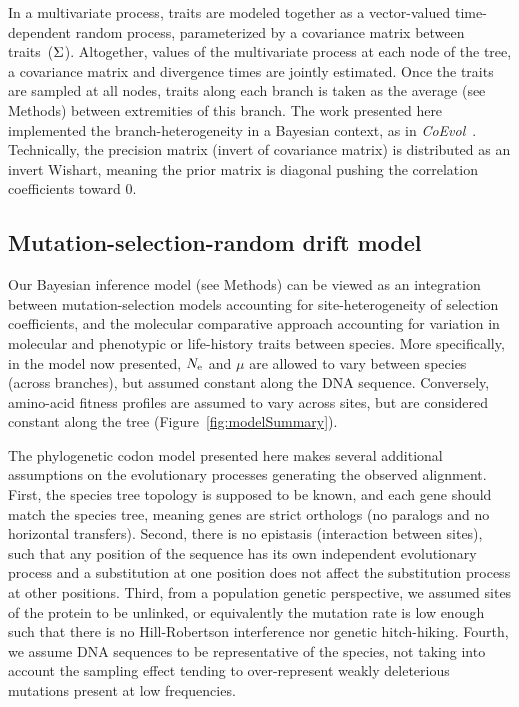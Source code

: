 In a multivariate process, traits are modeled together as a vector-valued time-dependent random process, parameterized by a covariance matrix between traits~($\Sigma$).
Altogether, values of the multivariate process at each node of the tree, a covariance matrix and divergence times are jointly estimated.
Once the traits are sampled at all nodes, traits along each branch is taken as the average (see Methods) between extremities of this branch.
The work presented here implemented the branch-heterogeneity in a Bayesian context, as in \textit{CoEvol}~\citep{Lartillot2011}.
Technically, the precision matrix (invert of covariance matrix) is distributed as an invert Wishart, meaning the \gls{prior} matrix is diagonal pushing the correlation coefficients toward $0$.

\subsection{Mutation-selection-random drift model}
\label{sec:BranchSiteHetero}
Our Bayesian inference model (see Methods) can be viewed as an integration between mutation-selection models accounting for site-heterogeneity of selection coefficients, and the molecular comparative approach accounting for variation in molecular and phenotypic or life-history traits between species.
More specifically, in the model now presented, $N_{\mathrm{e}}$ and $\mu$ are allowed to vary between species (across branches), but assumed constant along the \acrshort{DNA} sequence.
Conversely, amino-acid fitness profiles are assumed to vary across sites, but are considered constant along the tree (Figure~\ref{fig:modelSummary}).

The phylogenetic \gls{codon} model presented here makes several additional assumptions on the evolutionary processes generating the observed alignment.
First, the species tree topology is supposed to be known, and each gene should match the species tree, meaning genes are strict orthologs (no paralogs and no horizontal transfers).
Second, there is no epistasis (interaction between sites), such that any position of the sequence has its own independent evolutionary process and a \gls{substitution} at one position does not affect the \gls{substitution} process at other positions.
Third, from a population genetic perspective, we assumed sites of the protein to be unlinked, or equivalently the mutation rate is low enough such that there is no Hill-Robertson interference nor genetic hitch-hiking.
Fourth, we assume \acrshort{DNA} sequences to be representative of the species, not taking into account the sampling effect tending to over-represent weakly deleterious mutations present at low frequencies.


